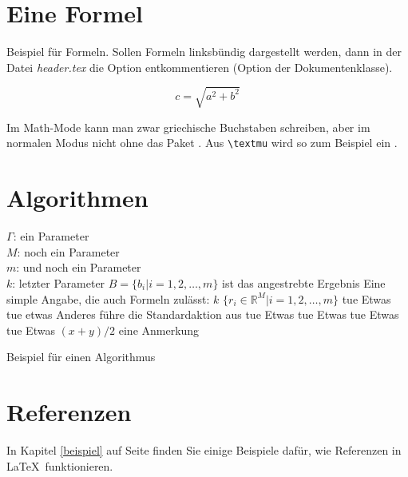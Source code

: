 \section{Eine Formel}

Beispiel für Formeln. Sollen Formeln linksbündig dargestellt werden, dann in der Datei \textit{header.tex} die Option  entkommentieren (Option der Dokumentenklasse).

\begin{equation}\label{eq:pyth}
  c = \sqrt{a^2 + b^2}
\end{equation}

Im Math-Mode kann man zwar griechische Buchstaben schreiben, aber im normalen Modus nicht ohne das Paket . Aus \verb$\textmu$ wird so zum Beispiel ein \textmu.

\section{Algorithmen}

\begin{algorithm}[htb]
  \begin{algorithmic}[1]
    \REQUIRE $\Gamma$: ein Parameter \\ $M$: noch ein Parameter  \\  $m$: und noch ein Parameter \\ $k$: letzter Parameter
    \ENSURE $B = \{b_i|i = 1, 2,\dots, m\}$ ist das angestrebte Ergebnis
    \STATE Eine simple Angabe, die auch Formeln zulässt: $k$ \leftarrow $\{r_i \in \mathbb{R}^M |i = 1, 2,\dots, m\}$
    \STATE tue Etwas
    \STATE tue etwas Anderes
    \ELSE
    \STATE führe die Standardaktion aus
    \ENDIF
    \STATE tue Etwas
    \ENDFOR
    \STATE tue Etwas
    \ENDWHILE
    \REPEAT
    \STATE tue Etwas
    \LOOP
    \STATE tue Etwas
    \ENDLOOP
    \RETURN $(x+y)/2$ \COMMENT eine Anmerkung
  \end{algorithmic}
  \caption{Beispiel für einen Algorithmus}
  \label{alg:example}
\end{algorithm}

\section{Referenzen}
\label{refn}

In Kapitel \ref{beispiel} auf Seite \pageref{refn} finden Sie einige Beispiele dafür, wie Referenzen in \LaTeX~funktionieren.

